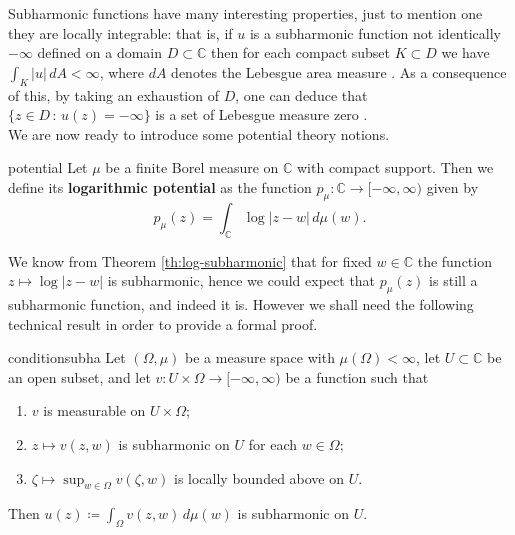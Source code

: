 Subharmonic functions have many interesting properties, just to mention one they are locally integrable: that is, if $u$ is a subharmonic function not identically $-\infty$ defined on a domain $D\subset \mathbb{C}$ then for each compact subset $K\subset D$ we have $\int_K|u|\,dA<\infty$, where $dA$ denotes the Lebesgue area measure \cite[Theorem 2.5.1]{ransford}. As a consequence of this, by taking an exhaustion of $D$, one can deduce that $\{z\in D\,:\, u(z)=-\infty\}$ is a set of Lebesgue measure zero \cite[Corollary 2.5.3]{ransford}.\\

We are now ready to introduce some potential theory notions.

\begin{mydef}{}{potential}
Let $\mu$ be a finite Borel measure on $\mathbb{C}$ with compact support. Then we define its {\bf logarithmic potential} as the function $p_\mu:\mathbb{C} \rightarrow [-\infty,\infty)$ given by
$$p_\mu(z) = \int_{\mathbb{C}} \log|z-w|\,d\mu(w).$$ 
\end{mydef}

We know from Theorem \ref{th:log-subharmonic} that for fixed $w\in \mathbb{C}$ the function $z\mapsto \log|z-w|$ is subharmonic, hence we could expect that $p_\mu(z)$ is still a subharmonic function, and indeed it is. However we shall need the following technical result in order to provide a formal proof.

\begin{mytheo}{}{conditionsubha}
Let $(\Omega,\mu)$ be a measure space with $\mu(\Omega)<\infty$, let $U\subset \mathbb{C}$ be an open subset, and let $v:U\times \Omega \rightarrow [-\infty,\infty)$ be a function such that
\begin{enumerate}
\item[(a)] $v$ is measurable on $U\times \Omega$;\\
\item[(b)] $z\mapsto v(z,w)$ is subharmonic on $U$ for each $w\in \Omega$;\\
\item[(c)] $\zeta \mapsto \sup_{w\in \Omega} v(\zeta,w)$ is locally bounded above on $U$.
\end{enumerate}
Then $u(z)\coloneqq \int_\Omega v(z,w)\,d\mu(w)$ is subharmonic on $U$.
\end{mytheo}

